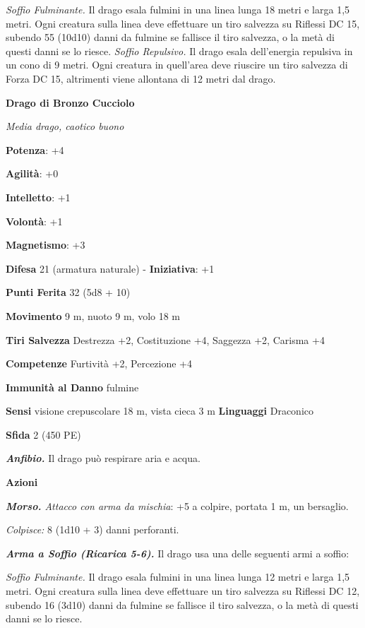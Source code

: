 \begin{multicols}{2}
\emph{Soffio Fulminante.} Il drago esala fulmini in una linea lunga 18
metri e larga 1,5 metri. Ogni creatura sulla linea deve effettuare un
tiro salvezza su Riflessi DC 15, subendo 55 (10d10) danni da fulmine se
fallisce il tiro salvezza, o la metà di questi danni se lo riesce.
\emph{Soffio Repulsivo.} Il drago esala dell'energia repulsiva in un
cono di 9 metri. Ogni creatura in quell'area deve riuscire un tiro
salvezza di Forza DC 15, altrimenti viene allontana di 12 metri dal
drago.

\textbf{Drago di Bronzo Cucciolo}

\emph{Media drago, caotico buono}

\textbf{Potenza}: +4

\textbf{Agilità}: +0

\textbf{Intelletto}: +1

\textbf{Volontà}: +1

\textbf{Magnetismo}: +3

\textbf{Difesa} 21 (armatura naturale) - \textbf{Iniziativa}: +1

\textbf{Punti Ferita} 32 (5d8 + 10)

\textbf{Movimento} 9 m, nuoto 9 m, volo 18 m

\textbf{Tiri Salvezza} Destrezza +2, Costituzione +4, Saggezza +2,
Carisma +4

\textbf{Competenze} Furtività +2, Percezione +4

\textbf{Immunità al Danno} fulmine

\textbf{Sensi} visione crepuscolare 18 m, vista cieca 3 m
\textbf{Linguaggi} Draconico

\textbf{Sfida} 2 (450 PE)\smallskip

\emph{\textbf{Anfibio.}} Il drago può respirare aria e acqua.

\smallskip\textbf{Azioni}

\emph{\textbf{Morso.} Attacco con arma da mischia}: +5 a colpire,
portata 1 m, un bersaglio.

\emph{Colpisce:} 8 (1d10 + 3) danni perforanti.

\emph{\textbf{Arma a Soffio (Ricarica 5-6).}} Il drago usa una delle
seguenti armi a soffio:

\emph{Soffio Fulminante.} Il drago esala fulmini in una linea lunga 12
metri e larga 1,5 metri. Ogni creatura sulla linea deve effettuare un
tiro salvezza su Riflessi DC 12, subendo 16 (3d10) danni da fulmine se
fallisce il tiro salvezza, o la metà di questi danni se lo riesce.


\end{multicols}
